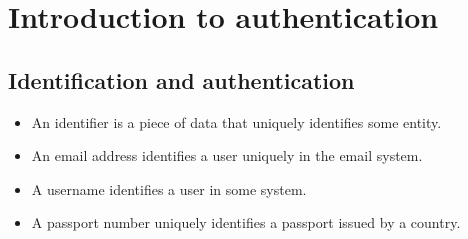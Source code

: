 \mode*




\section[Intro authentication]{Introduction to authentication}

\subsection{Identification and authentication}

\begin{frame}
  \begin{definition}[Identifier]
    \begin{itemize}
      \item An identifier is a piece of data that uniquely identifies some 
        entity.
    \end{itemize}
  \end{definition}

  \begin{example}[Identifiers]
    \begin{itemize}
      \item An email address identifies a user uniquely in the email system.
      \item A username identifies a user in some system.
      \item A passport number uniquely identifies a passport issued by 
        a country.
    \end{itemize}
  \end{example}
\end{frame}

